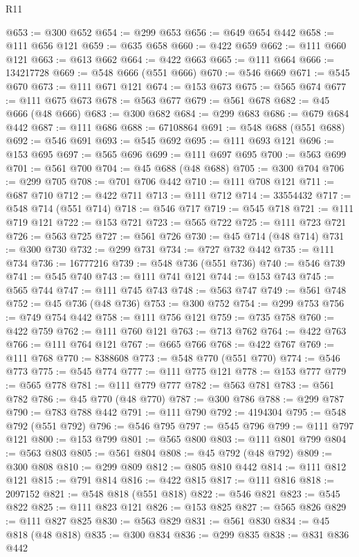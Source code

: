 \begin{lexlean}{R11}
\begin{coremodule}
{{{{{{{{{{{{{{{{{{{{{{{{{{{{{{{{{{{{{{{{{{{{{{{{{{{{{{{{{{{{{{{{{{{{{{{{{{{{{{{{{{@653 := @300 @652
@654 := @299 @653
@656 := @649 @654 @442
@658 := @111 @656 @121
@659 := @635 @658
@660 := @422 @659
@662 := @111 @660 @121
@663 := @613 @662
@664 := @422 @663
@665 := @111 @664
@666 := 134217728
@669 := @548 @666 (@551 @666)
@670 := @546 @669
@671 := @545 @670
@673 := @111 @671 @121
@674 := @153 @673
@675 := @565 @674
@677 := @111 @675 @673
@678 := @563 @677
@679 := @561 @678
@682 := @45 @666 (@48 @666)
@683 := @300 @682
@684 := @299 @683
@686 := @679 @684 @442
@687 := @111 @686
@688 := 67108864
@691 := @548 @688 (@551 @688)
@692 := @546 @691
@693 := @545 @692
@695 := @111 @693 @121
@696 := @153 @695
@697 := @565 @696
@699 := @111 @697 @695
@700 := @563 @699
@701 := @561 @700
@704 := @45 @688 (@48 @688)
@705 := @300 @704
@706 := @299 @705
@708 := @701 @706 @442
@710 := @111 @708 @121
@711 := @687 @710
@712 := @422 @711
@713 := @111 @712
@714 := 33554432
@717 := @548 @714 (@551 @714)
@718 := @546 @717
@719 := @545 @718
@721 := @111 @719 @121
@722 := @153 @721
@723 := @565 @722
@725 := @111 @723 @721
@726 := @563 @725
@727 := @561 @726
@730 := @45 @714 (@48 @714)
@731 := @300 @730
@732 := @299 @731
@734 := @727 @732 @442
@735 := @111 @734
@736 := 16777216
@739 := @548 @736 (@551 @736)
@740 := @546 @739
@741 := @545 @740
@743 := @111 @741 @121
@744 := @153 @743
@745 := @565 @744
@747 := @111 @745 @743
@748 := @563 @747
@749 := @561 @748
@752 := @45 @736 (@48 @736)
@753 := @300 @752
@754 := @299 @753
@756 := @749 @754 @442
@758 := @111 @756 @121
@759 := @735 @758
@760 := @422 @759
@762 := @111 @760 @121
@763 := @713 @762
@764 := @422 @763
@766 := @111 @764 @121
@767 := @665 @766
@768 := @422 @767
@769 := @111 @768
@770 := 8388608
@773 := @548 @770 (@551 @770)
@774 := @546 @773
@775 := @545 @774
@777 := @111 @775 @121
@778 := @153 @777
@779 := @565 @778
@781 := @111 @779 @777
@782 := @563 @781
@783 := @561 @782
@786 := @45 @770 (@48 @770)
@787 := @300 @786
@788 := @299 @787
@790 := @783 @788 @442
@791 := @111 @790
@792 := 4194304
@795 := @548 @792 (@551 @792)
@796 := @546 @795
@797 := @545 @796
@799 := @111 @797 @121
@800 := @153 @799
@801 := @565 @800
@803 := @111 @801 @799
@804 := @563 @803
@805 := @561 @804
@808 := @45 @792 (@48 @792)
@809 := @300 @808
@810 := @299 @809
@812 := @805 @810 @442
@814 := @111 @812 @121
@815 := @791 @814
@816 := @422 @815
@817 := @111 @816
@818 := 2097152
@821 := @548 @818 (@551 @818)
@822 := @546 @821
@823 := @545 @822
@825 := @111 @823 @121
@826 := @153 @825
@827 := @565 @826
@829 := @111 @827 @825
@830 := @563 @829
@831 := @561 @830
@834 := @45 @818 (@48 @818)
@835 := @300 @834
@836 := @299 @835
@838 := @831 @836 @442
}}}}}}}}}}}}}}}}}}}}}}}}}}}}}}}}}}}}}}}}}}}}}}}}}}}}}}}}}}}}}}}}}}}}}}}}}}}}}}}}}}
\end{coremodule}
\end{lexlean}

